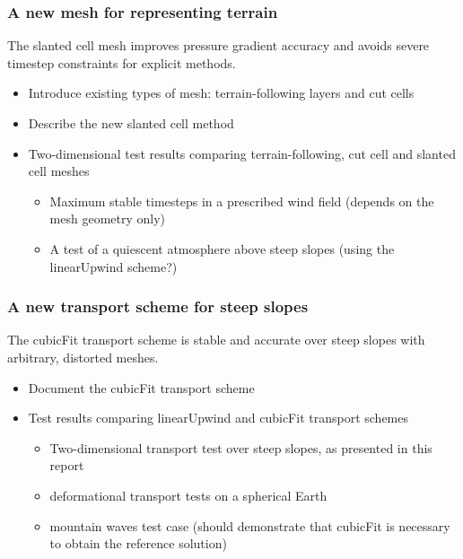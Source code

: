 \documentclass[a4paper,11pt]{article}
\begin{document}
\subsubsection*{A new mesh for representing terrain}
\noindent The slanted cell mesh improves pressure gradient accuracy and avoids severe timestep constraints for explicit methods.
\begin{itemize}[itemsep=0.1em]
	\item Introduce existing types of mesh: terrain-following layers and cut cells
	\item Describe the new slanted cell method
	\item {Two-dimensional test results comparing terrain-following, cut cell and slanted cell meshes
	\begin{itemize}[itemsep=0.1em,topsep=0pt]
		\item Maximum stable timesteps in a prescribed wind field (depends on the mesh geometry only)
		\item A test of a quiescent atmosphere above steep slopes (using the linearUpwind scheme?)
	\end{itemize}}
\end{itemize}

\subsubsection*{A new transport scheme for steep slopes}
\noindent The cubicFit transport scheme is stable and accurate over steep slopes with arbitrary, distorted meshes.
\begin{itemize}[itemsep=0.1em]
	\item Document the cubicFit transport scheme
	\item {Test results comparing linearUpwind and cubicFit transport schemes
	\begin{itemize}[itemsep=0.1em,topsep=0pt]
		\item Two-dimensional transport test over steep slopes, as presented in this report
		\item \citet{lauritzen2012} deformational transport tests on a spherical Earth
		\item \citet{schaer2002} mountain waves test case (should demonstrate that cubicFit is necessary to obtain the reference solution)
	\end{itemize}}
\end{itemize}
	
\end{document}
